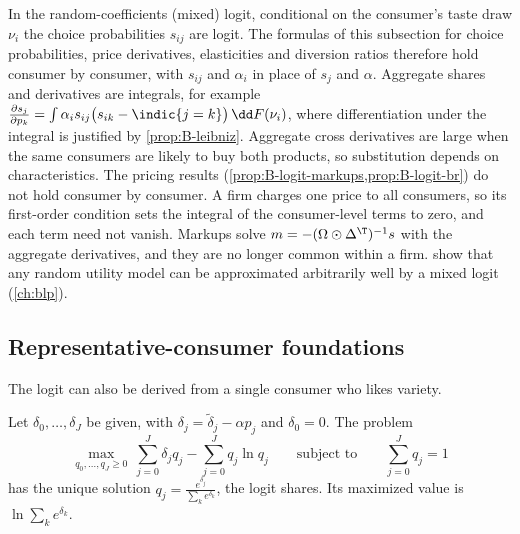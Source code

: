\begin{remark}\label{rem:B-mixed}
In the random-coefficients (mixed) logit, conditional on the consumer's taste draw $\nu_i$ the choice
probabilities $s_{ij}$ are logit. The formulas of this subsection for choice probabilities, price derivatives,
elasticities and diversion ratios therefore hold consumer by consumer, with $s_{ij}$ and $\alpha_i$ in place of $s_j$
and $\alpha$. Aggregate shares and derivatives are integrals, for example
$\frac{\partial s_j}{\partial p_k} = \int\alpha_is_{ij}\big(s_{ik} - \indic\{j = k\}\big)\,\dd F(\nu_i)$, where differentiation
under the integral is justified by \cref{prop:B-leibniz}. Aggregate cross derivatives are large when the same
consumers are likely to buy both products, so substitution depends on characteristics. The pricing results
(\cref{prop:B-logit-markups,prop:B-logit-br}) do not hold consumer by consumer. A firm charges one price to all
consumers, so its first-order condition sets the integral of the consumer-level terms to zero, and each term need
not vanish. Markups solve $m = -(\Omega \odot \Delta^\T)^{-1}s$ with the aggregate derivatives, and they are no longer
common within a firm. \citet{McFaddenTrain2000} show that any random utility model can be approximated
arbitrarily well by a mixed logit (\cref{ch:blp}).
\end{remark}

\subsection{Representative-consumer foundations}\label{sec:B-entropy}

The logit can also be derived from a single consumer who likes variety.

\begin{proposition}\label{prop:B-entropy}
Let $\delta_0, \dots, \delta_J$ be given, with $\delta_j = \tilde\delta_j - \alpha p_j$ and $\delta_0 = 0$. The problem
\begin{equation}\label{eq:B-entropy}
\max_{q_0, \dots, q_J \geq 0}\ \sum_{j = 0}^J\delta_jq_j - \sum_{j = 0}^Jq_j\ln q_j
\qquad\text{subject to}\qquad \sum_{j = 0}^Jq_j = 1
\end{equation}
has the unique solution $q_j = \frac{e^{\delta_j}}{\sum_ke^{\delta_k}}$, the logit shares. Its maximized value is
$\ln\sum_ke^{\delta_k}$.
\end{proposition}

